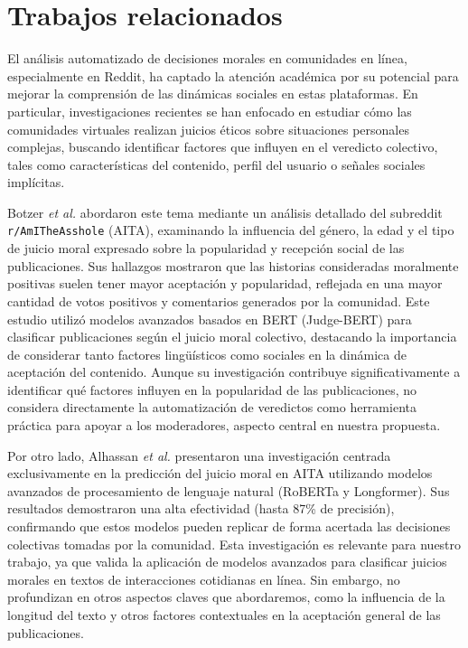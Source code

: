 \section{Trabajos relacionados}

El análisis automatizado de decisiones morales en comunidades en línea, especialmente en Reddit, ha captado la atención académica por su potencial para mejorar la comprensión de las dinámicas sociales en estas plataformas. En particular, investigaciones recientes se han enfocado en estudiar cómo las comunidades virtuales realizan juicios éticos sobre situaciones personales complejas, buscando identificar factores que influyen en el veredicto colectivo, tales como características del contenido, perfil del usuario o señales sociales implícitas.

Botzer \textit{et al.} \cite{botzer2023} abordaron este tema mediante un análisis detallado del subreddit \texttt{r/AmITheAsshole} (AITA), examinando la influencia del género, la edad y el tipo de juicio moral expresado sobre la popularidad y recepción social de las publicaciones. Sus hallazgos mostraron que las historias consideradas moralmente positivas suelen tener mayor aceptación y popularidad, reflejada en una mayor cantidad de votos positivos y comentarios generados por la comunidad. Este estudio utilizó modelos avanzados basados en BERT (Judge-BERT) para clasificar publicaciones según el juicio moral colectivo, destacando la importancia de considerar tanto factores lingüísticos como sociales en la dinámica de aceptación del contenido. Aunque su investigación contribuye significativamente a identificar qué factores influyen en la popularidad de las publicaciones, no considera directamente la automatización de veredictos como herramienta práctica para apoyar a los moderadores, aspecto central en nuestra propuesta.

Por otro lado, Alhassan \textit{et al.} \cite{alhassan2022} presentaron una investigación centrada exclusivamente en la predicción del juicio moral en AITA utilizando modelos avanzados de procesamiento de lenguaje natural (RoBERTa y Longformer). Sus resultados demostraron una alta efectividad (hasta 87\% de precisión), confirmando que estos modelos pueden replicar de forma acertada las decisiones colectivas tomadas por la comunidad. Esta investigación es relevante para nuestro trabajo, ya que valida la aplicación de modelos avanzados para clasificar juicios morales en textos de interacciones cotidianas en línea. Sin embargo, no profundizan en otros aspectos claves que abordaremos, como la influencia de la longitud del texto y otros factores contextuales en la aceptación general de las publicaciones.


